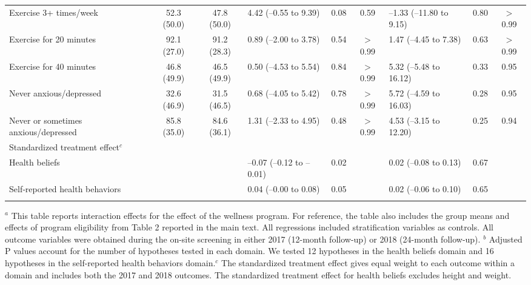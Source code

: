 \documentclass{article}
\begin{document}
\begin{landscape}
\begin{table}[tbp]
{\begin{tabularx}{\linewidth}{lCClCClCC}
\hspace{1em} Exercise 3+ times/week&52.3  (50.0)&47.8  (50.0)&4.42 (--0.55 to 9.39)&0.08&0.59&--1.33 (--11.80 to 9.15)&0.80&$>$0.99 \tabularnewline
\hspace{1em} Exercise for 20 minutes&92.1  (27.0)&91.2  (28.3)&0.89 (--2.00 to 3.78)&0.54&$>$0.99&1.47 (--4.45 to 7.38)&0.63&$>$0.99 \tabularnewline
\hspace{1em} Exercise for 40 minutes&46.8  (49.9)&46.5  (49.9)&0.50 (--4.53 to 5.54)&0.84&$>$0.99&5.32 (--5.48 to 16.12)&0.33&0.95 \tabularnewline
\hspace{1em} Never anxious/depressed&32.6  (46.9)&31.5  (46.5)&0.68 (--4.05 to 5.42)&0.78&$>$0.99&5.72 (--4.59 to 16.03)&0.28&0.95 \tabularnewline
\hspace{1em} Never or sometimes anxious/depressed&85.8  (35.0)&84.6  (36.1)&1.31 (--2.33 to 4.95)&0.48&$>$0.99&4.53 (--3.15 to 12.20)&0.25&0.94 \tabularnewline
Standardized treatment effect$^{c}$&&&&&&&& \tabularnewline
\hspace{1em} Health beliefs&&&--0.07 (--0.12 to --0.01)&0.02&&0.02 (--0.08 to 0.13)&0.67& \tabularnewline
\hspace{1em} Self‐reported health behaviors&&&0.04 (--0.00 to 0.08)&0.05&&0.02 (--0.06 to 0.10)&0.65& \tabularnewline
\bottomrule \addlinespace[\belowrulesep]

\end{tabularx}
\begin{flushleft}
\tiny $^{a}$ This table reports interaction effects for the effect of the wellness program. For reference, the table also includes the group means and effects of program eligibility from Table 2 reported in the main text. All regressions included stratification variables as controls. All outcome variables were obtained during the on-site screening in either 2017 (12-month follow-up) or 2018 (24-month follow-up). \newline $^{b}$ Adjusted P values account for the number of hypotheses tested in each domain. We tested 12 hypotheses in the health beliefs domain and 16 hypotheses in the self-reported health behaviors domain.\newline $^{c}$ The standardized treatment effect gives equal weight to each outcome within a domain and includes both the 2017 and 2018 outcomes. The standardized treatment effect for health beliefs excludes height and weight.
\end{flushleft}
}
\end{table}
\end{landscape}
\end{document}
